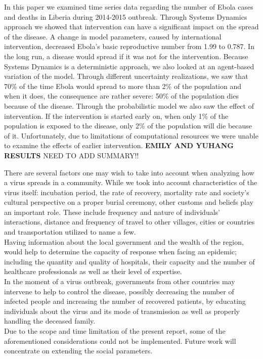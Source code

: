 In this paper we examined time series data  regarding the number of Ebola cases and deaths in Liberia during 2014-2015 outbreak. Through Systems Dynamics approach we showed that intervention can have a significant impact on the spread of the disease. A change in model parameters, caused by international intervention, decreased Ebola's basic reproductive number from 1.99 to 0.787. In the long run, a disease would spread if it was not for the intervention. Because Systems Dynamics is a deterministic approach, we also looked at an agent-based variation of the model. Through different uncertainty realizations, we saw that  70\% of the time Ebola would spread to more than 2\% of the population and when it does, the consequence are rather severe: 50\% of the population dies because of the disease. Through the probabilistic model we also saw the effect of intervention. If the intervention is started early on, when only 1\% of the population is exposed to the disease, only 2\% of the population will die because of it. Unfortunately, due to limitations of computational resources we were unable to examine the effects of earlier intervention. \textbf{EMILY AND YUHANG RESULTS}
NEED TO ADD SUMMARY!!

There are several factors one may wish to take into account when analyzing how a virus spreads in a community. While we took into account characteristics of the virus itself: incubation period, the rate of recovery, mortality rate and society's cultural perspective on a proper burial ceremony, other customs and beliefs play an important role. These include frequency and nature of individuals' interactions, distance and frequency of travel to other villages, cities or countries and transportation utilized to name a few.\\
Having information about the local government and the wealth of the region, would help to determine the capacity of response when facing an epidemic; including the quantity and quality of hospitals, their capacity and the number of healthcare professionals as well as 
their level of  expertise.\\
In the moment of a virus outbreak, governments from other countries may intervene to help to control the disease, possibly decreasing the number of infected people and increasing the number of recovered patients, by educating individuals about the virus and its mode of transmission as well as properly handling the deceased family. \\
Due to the scope and time limitation of the present report, some of the aforementioned considerations could not be implemented. Future work will concentrate on extending the social parameters. 

